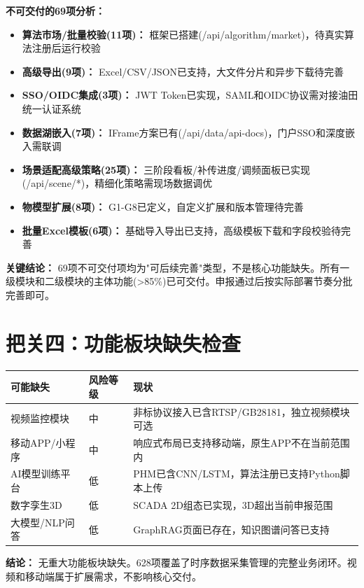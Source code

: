 \documentclass[11pt,a4paper]{ctexart}
\begin{document}
\textbf{不可交付的69项分析：}
\begin{itemize}
  \item \textbf{算法市场/批量校验(11项)：} 框架已搭建(/api/algorithm/market)，待真实算法注册后运行校验
  \item \textbf{高级导出(9项)：} Excel/CSV/JSON已支持，大文件分片和异步下载待完善
  \item \textbf{SSO/OIDC集成(3项)：} JWT Token已实现，SAML和OIDC协议需对接油田统一认证系统
  \item \textbf{数据湖嵌入(7项)：} IFrame方案已有(/api/data/api-docs)，门户SSO和深度嵌入需联调
  \item \textbf{场景适配高级策略(25项)：} 三阶段看板/补传进度/调频面板已实现(/api/scene/*)，精细化策略需现场数据调优
  \item \textbf{物模型扩展(8项)：} G1-G8已定义，自定义扩展和版本管理待完善
  \item \textbf{批量Excel模板(6项)：} 基础导入导出已支持，高级模板下载和字段校验待完善
\end{itemize}

\textbf{关键结论：} 69项不可交付项均为"可后续完善"类型，不是核心功能缺失。所有一级模块和二级模块的主体功能(>85\%)已可交付。申报通过后按实际部署节奏分批完善即可。

\section{把关四：功能板块缺失检查}

\begin{table}[H]\centering
\begin{tabular}{p{4cm}p{3cm}p{5cm}}
\toprule\textbf{可能缺失} & \textbf{风险等级} & \textbf{现状} \\
\midrule
视频监控模块 & \color{warn}中 & 非标协议接入已含RTSP/GB28181，独立视频模块可选 \\
移动APP/小程序 & \color{warn}中 & 响应式布局已支持移动端，原生APP不在当前范围内 \\
AI模型训练平台 & \color{ok}低 & PHM已含CNN/LSTM，算法注册已支持Python脚本上传 \\
数字孪生3D & \color{ok}低 & SCADA 2D组态已实现，3D超出当前申报范围 \\
大模型/NLP问答 & \color{ok}低 & GraphRAG页面已存在，知识图谱问答已支持 \\
\bottomrule
\end{tabular}
\end{table}

\textbf{结论：} 无重大功能板块缺失。628项覆盖了时序数据采集管理的完整业务闭环。视频和移动端属于扩展需求，不影响核心交付。
\end{document}
